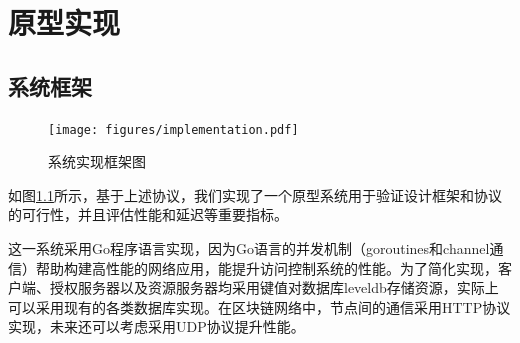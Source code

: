 
\chapter{原型实现}
\label{chap:implementation}

\section{系统框架}

\begin{figure}
\centering
\texttt{[image: figures/implementation.pdf]}
\caption{系统实现框架图}
\label{fig:implementation}
\end{figure}

如图\ref{fig:implementation}所示，基于上述协议，我们实现了一个原型系统用于验证设计框架和协议的可行性，并且评估性能和延迟等重要指标。

这一系统采用Go程序语言实现，因为Go语言的并发机制（goroutines和channel通信）帮助构建高性能的网络应用，能提升访问控制系统的性能。为了简化实现，客户端、授权服务器以及资源服务器均采用键值对数据库leveldb存储资源，实际上可以采用现有的各类数据库实现。在区块链网络中，节点间的通信采用HTTP协议实现，未来还可以考虑采用UDP协议提升性能。

